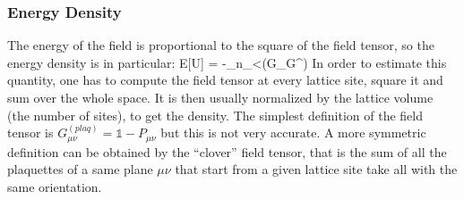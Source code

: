 \subsubsection{Energy Density}
The energy of the field is proportional to the square of the field tensor, so the energy density is in particular:
\beq
    E[U] = -\sum_{n\in\Lambda}\sum_{\mu<\nu}\Tr(G_{\mu\nu}G^{\mu\nu})
    \label{eq:energy}
\eeq
In order to estimate this quantity, one has to compute the field tensor at every lattice site, square it and sum over the whole space. It is then usually normalized by the lattice volume (the number of sites), to get the density. The simplest definition of the field tensor is $G_{\mu\nu}^{(plaq)} = \mathds{1} - P_{\mu\nu}$ but this is not very accurate. A more symmetric definition can be obtained by the ``clover'' field tensor, that is the sum of all the plaquettes of a same plane $\mu\nu$ that start from a given lattice site take all with the same orientation. 

